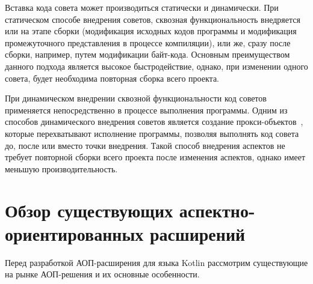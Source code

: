 \documentclass[conference]{IEEEtran}
\begin{document}

Вставка кода совета может производиться статически и динамически.
При статическом способе внедрения советов, сквозная функциональность внедряется
или на этапе сборки (модификация исходных кодов программы и модификация
промежуточного представления в процессе компиляции), или же, сразу после сборки, 
например, путем модификации байт-кода.
Основным преимуществом данного подхода является высокое быстродействие, однако, 
при изменении одного совета, будет необходима повторная сборка всего проекта.

При динамическом внедрении сквозной функциональности код советов применяется
непосредственно в процессе выполнения программы.
Одним из способов динамического внедрения советов является создание 
прокси-объектов~\cite{aspect_dynamic_weavers}, которые перехватывают
исполнение программы, позволяя выполнять код совета до, после или вместо точки
внедрения.
Такой способ внедрения аспектов не требует повторной сборки всего проекта после
изменения аспектов, однако имеет меньшую производительность.

\section{Обзор существующих аспектно-ориентированных расширений}

Перед разработкой АОП-расширения для языка Kotlin рассмотрим существующие на
рынке АОП-решения и их основные особенности.
\end{document}
